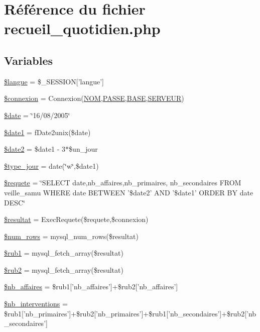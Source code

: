 \hypertarget{recueil__quotidien_8php}{
\section{R\'{e}f\'{e}rence du fichier recueil\_\-quotidien.php}
\label{recueil__quotidien_8php}
}
\subsection*{Variables}
\begin{CompactItemize}
\item 
\hyperlink{recueil__quotidien_8php_a0}{\$langue} = \$\_\-SESSION\mbox{[}'langue'\mbox{]}
\item 
\hyperlink{recueil__quotidien_8php_a1}{\$connexion} = Connexion(\hyperlink{pma__connect_8php_a0}{NOM},\hyperlink{pma__connect_8php_a1}{PASSE},\hyperlink{pma__connect_8php_a3}{BASE},\hyperlink{pma__connect_8php_a2}{SERVEUR})
\item 
\hyperlink{recueil__quotidien_8php_a2}{\$date} = \char`\"{}16/08/2005\char`\"{}
\item 
\hyperlink{recueil__quotidien_8php_a3}{\$date1} = f\-Date2unix(\$date)
\item 
\hyperlink{recueil__quotidien_8php_a4}{\$date2} = \$date1 - 3$\ast$\$un\_\-jour
\item 
\hyperlink{recueil__quotidien_8php_a5}{\$type\_\-jour} = date(\char`\"{}w\char`\"{},\$date1)
\item 
\hyperlink{recueil__quotidien_8php_a6}{\$requete} = \char`\"{}SELECT date,nb\_\-affaires,nb\_\-primaires, nb\_\-secondaires FROM veille\_\-samu WHERE date BETWEEN '\$date2' AND '\$date1' ORDER BY date DESC\char`\"{}
\item 
\hyperlink{recueil__quotidien_8php_a7}{\$resultat} = Exec\-Requete(\$requete,\$connexion)
\item 
\hyperlink{recueil__quotidien_8php_a8}{\$num\_\-rows} = mysql\_\-num\_\-rows(\$resultat)
\item 
\hyperlink{recueil__quotidien_8php_a9}{\$rub1} = mysql\_\-fetch\_\-array(\$resultat)
\item 
\hyperlink{recueil__quotidien_8php_a10}{\$rub2} = mysql\_\-fetch\_\-array(\$resultat)
\item 
\hyperlink{recueil__quotidien_8php_a11}{\$nb\_\-affaires} = \$rub1\mbox{[}'nb\_\-affaires'\mbox{]}+\$rub2\mbox{[}'nb\_\-affaires'\mbox{]}
\item 
\hyperlink{recueil__quotidien_8php_a12}{\$nb\_\-interventions} = \$rub1\mbox{[}'nb\_\-primaires'\mbox{]}+\$rub2\mbox{[}'nb\_\-primaires'\mbox{]}+\$rub1\mbox{[}'nb\_\-secondaires'\mbox{]}+\$rub2\mbox{[}'nb\_\-secondaires'\mbox{]}

\end{CompactItemize}
